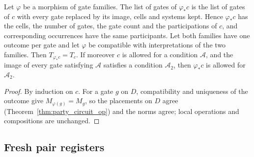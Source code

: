\begin{theorem}
    \label{thm:party_map_gates}
    \leanok
    Let $\varphi$ be a morphism of gate families. The list of gates of $\varphi_*c$ is
    the list of gates of $c$ with every gate replaced by its image, cells and systems
    kept. Hence $\varphi_*c$ has the cells, the number of gates, the gate count and the
    participations of $c$, and corresponding occurrences have the same participants.
    Let both families have one outcome per gate and let $\varphi$ be compatible with
    interpretations of the two families. Then $T_{\varphi_*c}=T_c$. If moreover $c$ is
    allowed for a condition $\mathcal A$, and the image of every gate satisfying
    $\mathcal A$ satisfies a condition $\mathcal A_2$, then $\varphi_*c$ is allowed for
    $\mathcal A_2$.
\end{theorem}
\begin{proof}\leanok
    By induction on $c$. For a gate $g$ on $D$, compatibility and uniqueness of the
    outcome give $M_{\varphi(g)}=M_g$, so the placements on $D$ agree
    (Theorem~\ref{thm:party_circuit_op}) and the norms agree; local operations and
    compositions are unchanged.
\end{proof}

\subsection{Fresh pair registers}
\label{sec:party_syntax_add_pair}

